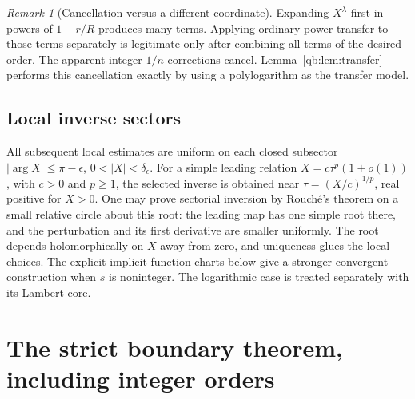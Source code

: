\documentclass[11pt,a4paper]{article}
\theoremstyle{definition}\newtheorem{definition}[theorem]{Definition}
\theoremstyle{remark}\newtheorem{remark}[theorem]{Remark}
\numberwithin{equation}{section}
\begin{document}
\begin{remark}[Cancellation versus a different coordinate]
Expanding $X^\lambda$ first in powers of $1-r/R$ produces many terms.
Applying ordinary power transfer to those terms separately is legitimate
only after combining all terms of the desired order. The apparent integer
$1/n$ corrections cancel. Lemma~\ref{qb:lem:transfer} performs this
cancellation exactly by using a polylogarithm as the transfer model.
\end{remark}

\subsection{Local inverse sectors}

All subsequent local estimates are uniform on each closed subsector
$|\arg X|\le\pi-\epsilon$, $0<|X|<\delta_\epsilon$. For a simple leading
relation $X=c\tau^p(1+o(1))$, with $c>0$ and $p\ge1$, the selected inverse
is obtained near $\tau=(X/c)^{1/p}$, real positive for $X>0$.
One may prove sectorial inversion by Rouch\'e's theorem on a small relative
circle about this root: the leading map has one simple root there,
and the perturbation and its first derivative are smaller uniformly.
The root depends holomorphically on $X$ away from zero, and uniqueness
glues the local choices. The explicit implicit-function charts below give
a stronger convergent construction when $s$ is noninteger. The logarithmic
case is treated separately with its Lambert core.

\section{The strict boundary theorem, including integer orders}\label{qb:sec:strict}
\end{document}
